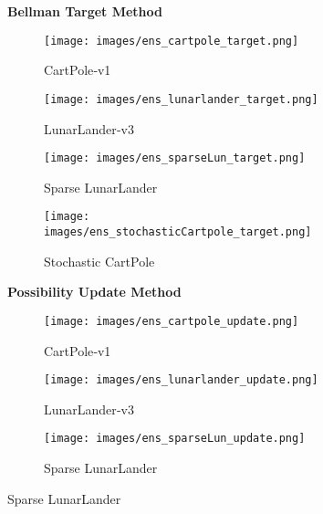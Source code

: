\documentclass[11pt,a4paper]{report}
\begin{document}
{ 
\sloppy 

\begin{figure}[ht]
  \centering

  
  \par\noindent\textbf{Bellman Target Method}\par\nopagebreak
  \vspace{0.5em} 

  
  \begin{subfigure}[b]{0.24\textwidth}
    \centering
    \texttt{[image: images/ens\_cartpole\_target.png]}
    \caption{CartPole‐v1} 
    
  \end{subfigure}
  \hfill 
  \begin{subfigure}[b]{0.24\textwidth}
    \centering
    \texttt{[image: images/ens\_lunarlander\_target.png]}
    \caption{LunarLander‐v3} 
    
  \end{subfigure}
  \hfill 
  \begin{subfigure}[b]{0.24\textwidth}
    \centering
    \texttt{[image: images/ens\_sparseLun\_target.png]}
    \caption{Sparse LunarLander} 
    
  \end{subfigure}
  \hfill 
  \begin{subfigure}[b]{0.24\textwidth}
    \centering
    \texttt{[image: images/ens\_stochasticCartpole\_target.png]}
    \caption{Stochastic CartPole} 
    
  \end{subfigure}

  \vspace{1em} 

  
  \par\noindent\textbf{Possibility Update Method}\par\nopagebreak
  \vspace{0.5em} 

  
  \begin{subfigure}[b]{0.24\textwidth}
    \centering
    \texttt{[image: images/ens\_cartpole\_update.png]}
    \caption{CartPole‐v1} 
    
  \end{subfigure}
  \hfill 
  \begin{subfigure}[b]{0.24\textwidth}
    \centering
    \texttt{[image: images/ens\_lunarlander\_update.png]}
    \caption{LunarLander‐v3} 
    
  \end{subfigure}
  \hfill 
   \begin{subfigure}[b]{0.24\textwidth}
    \centering
    \texttt{[image: images/ens\_sparseLun\_update.png]}
    \caption{Sparse LunarLander} 
    

\end{subfigure}
\end{figure}}
\end{document}
